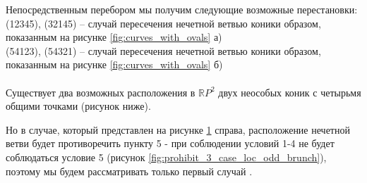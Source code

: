 \documentclass[14pt]{article}
\begin{document}
Непосредственным перебором мы получим следующие возможные перестановки:\\
(12345), (32145) – случай пересечения нечетной ветвью коники образом, показанным на рисунке \ref{fig:curves_with_ovals} а)\\ 
(54123), (54321) – случай пересечения нечетной ветвью коники образом, показанным на рисунке \ref{fig:curves_with_ovals} б)\\ 
\\
Существует два возможных расположения в $\mathbb RP^2$ двух неособых коник с четырьмя общими точками (рисунок ниже).
\\

\begin{figure}[H]
\caption{}
\label{fig:intersection_of_ovals}
\end{figure}

Но в случае, который представлен на рисунке \ref{fig:intersection_of_ovals} справа, расположение нечетной ветви будет противоречить пункту 5 - при соблюдении условий 1-4 не будет соблюдаться условие 5 (рисунок \ref{fig:prohibit_3_case_loc_odd_brunch}),  поэтому мы будем рассматривать только первый случай .
\end{document}
